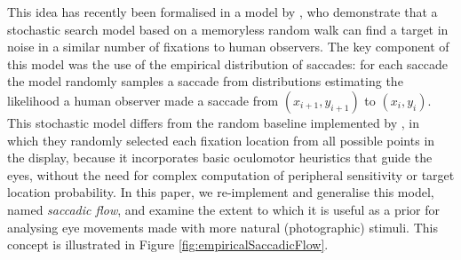 \documentclass[a4paper, twocolumn, oneside, 10pt]{article}
\begin{document}
This idea has recently been formalised in a model by \cite{clarke2015}, who demonstrate that a stochastic search model based on a memoryless random walk can find a target in noise in a similar number of fixations to human observers. The key component of this model was the use of the empirical distribution of saccades: for each saccade the model randomly samples a saccade from distributions estimating the likelihood a human observer made a saccade from $(x_{i+1},y_{i+1})$ to $(x_i,y_i)$. This stochastic model differs from the random baseline implemented by \cite{najemnik-geisler2008}, in which they randomly selected each fixation location from all possible points in the display, because it incorporates basic oculomotor heuristics that guide the eyes, without the need for complex computation of peripheral sensitivity or target location probability. In this paper, we re-implement and generalise this model, named \textit{saccadic flow}, and examine the extent to which it is useful as a prior for analysing eye movements made with more natural (photographic) stimuli. This concept is illustrated in Figure \ref{fig:empiricalSaccadicFlow}. 
\end{document}
